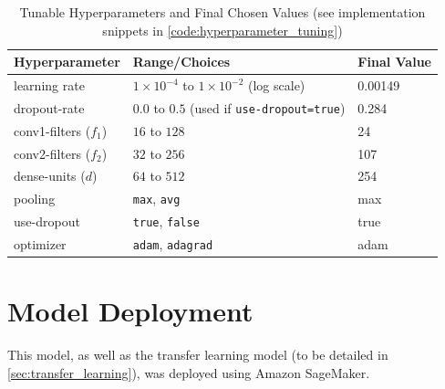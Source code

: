 \begin{table}[h]
    \centering
    \caption{Tunable Hyperparameters and Final Chosen Values (see implementation snippets in \cref{code:hyperparameter_tuning})}
    \begin{tabular}{lll}
    \toprule
    \textbf{Hyperparameter} & \textbf{Range/Choices} & \textbf{Final Value} \\
    \midrule
    learning rate           & $1{\times}10^{-4}$ to $1{\times}10^{-2}$ (log scale) & 0.00149 \\
    dropout-rate            & $0.0$ to $0.5$ (used if \texttt{use-dropout=true}) & 0.284 \\
    conv1-filters ($f_1$)   & $16$ to $128$ & 24 \\
    conv2-filters ($f_2$)   & $32$ to $256$ & 107 \\
    dense-units ($d$)       & $64$ to $512$ & 254 \\
    pooling                 & \texttt{max}, \texttt{avg} & max \\
    use-dropout             & \texttt{true}, \texttt{false} & true \\
    optimizer               & \texttt{adam}, \texttt{adagrad} & adam \\
    \bottomrule
    \end{tabular}
    \label{tab:tunable_hyperparameters}
\end{table}

\begin{figure}[h]
    
\end{figure}

\begin{figure}[p]
    
\end{figure}

\newpage

\section{Model Deployment} \label{sec:model_deployment}

This model, as well as the transfer learning model (to be detailed in \cref{sec:transfer_learning}), was deployed using Amazon SageMaker.

